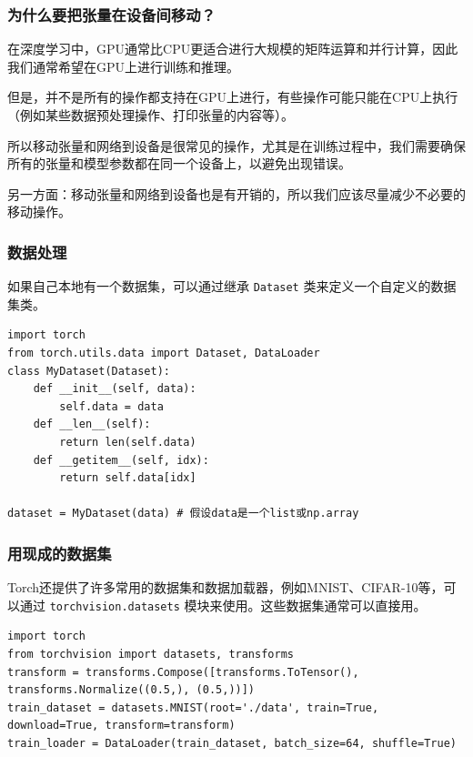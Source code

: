 \documentclass{ctexbeamer}
\begin{document}
\begin{frame}[fragile]
    \frametitle{为什么要把张量在设备间移动？}

    在深度学习中，GPU通常比CPU更适合进行大规模的矩阵运算和并行计算，因此我们通常希望在GPU上进行训练和推理。

    但是，并不是所有的操作都支持在GPU上进行，有些操作可能只能在CPU上执行（例如某些数据预处理操作、打印张量的内容等）。

    所以移动张量和网络到设备是很常见的操作，尤其是在训练过程中，我们需要确保所有的张量和模型参数都在同一个设备上，以避免出现错误。

    另一方面：移动张量和网络到设备也是有开销的，所以我们应该尽量减少不必要的移动操作。

\end{frame}

\begin{frame}[fragile]
    \frametitle{数据处理}

    如果自己本地有一个数据集，可以通过继承 \texttt{Dataset} 类来定义一个自定义的数据集类。
    \begin{verbatim}
import torch
from torch.utils.data import Dataset, DataLoader
class MyDataset(Dataset):
    def __init__(self, data):
        self.data = data
    def __len__(self):
        return len(self.data)
    def __getitem__(self, idx):
        return self.data[idx]

dataset = MyDataset(data) # 假设data是一个list或np.array
    \end{verbatim}

\end{frame}

\begin{frame}[fragile]
    \frametitle{用现成的数据集}

    Torch还提供了许多常用的数据集和数据加载器，例如MNIST、CIFAR-10等，可以通过 \texttt{torchvision.datasets} 模块来使用。这些数据集通常可以直接用。
    \begin{verbatim}
import torch
from torchvision import datasets, transforms
transform = transforms.Compose([transforms.ToTensor(), transforms.Normalize((0.5,), (0.5,))])
train_dataset = datasets.MNIST(root='./data', train=True, download=True, transform=transform)
train_loader = DataLoader(train_dataset, batch_size=64, shuffle=True)
    \end{verbatim}

\end{frame}
\end{document}
